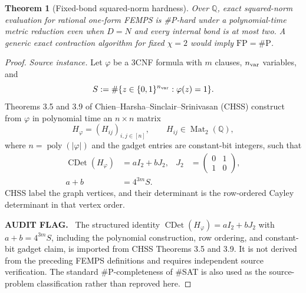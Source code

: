 \documentclass[aps,pra,reprint,superscriptaddress,nofootinbib,longbibliography,showkeys]{revtex4-2}
\newtheorem{theorem}{Theorem}[section]
\theoremstyle{definition}
\newenvironment{auditflag}
  {\par\smallskip\noindent\textbf{AUDIT FLAG.}\ }
  {\par\smallskip}
\newcommand{\Mat}{\operatorname{Mat}}
\newcommand{\CDet}{\operatorname{CDet}}
\begin{document}
\begin{theorem}[Fixed-bond squared-norm hardness]
Over $\mathbb Q$, exact squared-norm evaluation for rational one-form FEMPS is
\#P-hard under a polynomial-time metric reduction even when $D=N$ and every
internal bond is at most two.  A generic exact contraction algorithm for fixed
$\chi=2$ would imply $\mathrm{FP}=\#\mathrm P$.
\label{thm:c1}
\end{theorem}

\begin{proof}
\medskip\noindent\textit{Source instance.}\quad
Let $\varphi$ be a 3CNF formula with $m$ clauses, $n_{\rm var}$ variables, and
\begin{equation}
S:=\#\{z\in\{0,1\}^{n_{\rm var}}:\varphi(z)=1\}.
\end{equation}
Theorems 3.5 and 3.9 of
Chien--Harsha--Sinclair--Srinivasan (CHSS) construct from $\varphi$ in
polynomial time an $n\times n$ matrix
\begin{equation}
H_\varphi=(H_{ij})_{i,j\in[n]},
\qquad H_{ij}\in\Mat_2(\mathbb Q),
\end{equation}
where $n=\operatorname{poly}(|\varphi|)$ and the gadget entries are
constant-bit integers, such that
\begin{align}
 \CDet(H_\varphi)&=aI_2+bJ_2,
 &J_2&=\begin{pmatrix}0&1\\1&0\end{pmatrix},\nonumber\\
 a+b&=4^{3m}S.&&
\end{align}
CHSS label the graph vertices, and their determinant is the row-ordered Cayley
determinant in that vertex order.

\begin{auditflag}
The structured identity $\CDet(H_\varphi)=aI_2+bJ_2$ with
$a+b=4^{3m}S$, including the polynomial construction, row ordering, and
constant-bit gadget claim, is imported from CHSS Theorems 3.5 and 3.9.  It is
not derived from the preceding FEMPS definitions and requires independent
source verification.  The standard \#P-completeness of \#SAT is also used as
the source-problem classification rather than reproved here.
\end{auditflag}


\end{proof}
\end{document}
